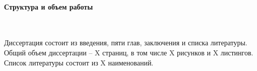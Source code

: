 \paragraph{Структура и объем работы} \

Диссертация состоит из введения, пяти глав, заключения и списка литературы.
Общий объем диссертации -- X страниц, в том числе X рисунков и X листингов.
Список литературы состоит из X наименований.